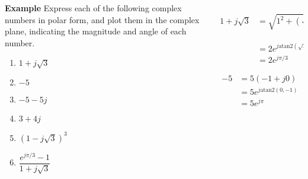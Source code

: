 \begin{frame}
    \begin{columns}[T]
        \begin{column}{0.3\textwidth}
            {\bf Example} Express each of the following complex numbers in polar form, and plot them in the complex plane, indicating the magnitude and angle of each number.
            \begin{enumerate}[<alert@+>]
                \item $1 + j\sqrt{3}$
                \item $-5$
                \item $-5 -5j$
                \item $3+4j$
                \item $(1-j\sqrt{3})^3$
                \item $\dfrac{e^{j\pi/3}-1}{1+j\sqrt{3}}$
            \end{enumerate}

        \end{column}
        \begin{column}{0.7\textwidth}
        \begin{overprint}
                \begin{align*}
                  1 + j\sqrt{3} &= \sqrt{1^2 + (\sqrt{3})^2}\left(\dfrac{1}{\sqrt{1^2 + (\sqrt{3})^2}} + j\dfrac{\sqrt{3}}{\sqrt{1^2 + (\sqrt{3})^2}}\right) \\
                   &= 2e^{j\mathrm{atan2}(\sqrt{3}, 1)} \\
                   &= 2e^{j\pi/3}
                \end{align*}

                \begin{align*}
                  -5 &= 5(-1 + j0) \\
                   &= 5e^{j\mathrm{atan2}(0, -1)} \\
                   &= 5e^{j\pi}
                \end{align*}


\end{overprint}
\end{column}
\end{columns}
\end{frame}

